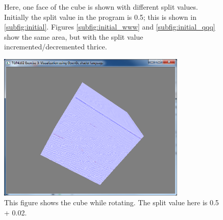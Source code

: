 \documentclass[a4paper, english, 12pt]{article}
\begin{document}


\begin{figure}[p]
	\hfill
	\hfill
	\caption{Here, one face of the cube is shown with different split values. Initially the split value in the program is 0.5; this is shown in \ref{subfig:initial}. Figures \ref{subfig:initial_www} and \ref{subfig:initial_qqq} show the same area, but with the split value incremented/decremented thrice.}
	\label{fig:cube_face}
\end{figure}
  
  \begin{figure}[p]
	\centering
	\includegraphics[clip=true, trim=3.2cm 1.0cm 3.2cm 2.0cm, width=0.8\textwidth]{graphics/rotating_ww.png}
\caption{This figure shows the cube while rotating. The split value here is 0.5 + 0.02.}
\label{fig:rotating}
\end{figure}
\end{document}
